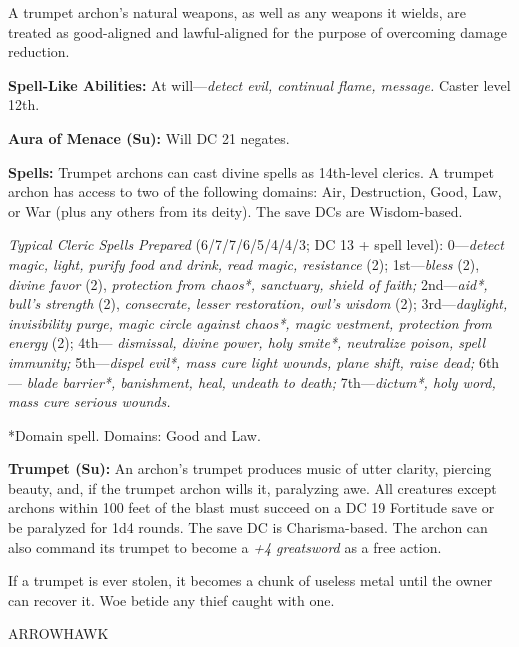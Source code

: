 \documentclass{article}
\begin{document}
A trumpet archon's natural weapons, as well as any weapons it wields, are treated 
as good-aligned and lawful-aligned for the purpose of overcoming damage reduction.

\textbf{Spell-Like Abilities: }At will---\textit{detect evil, continual flame, 
message. }Caster level 12th.

\textbf{Aura of Menace (Su):} Will DC 21 negates.

\textbf{Spells: }Trumpet archons can cast divine spells as 14th-level clerics. 
A trumpet archon has access to two of the following domains: Air, Destruction, 
Good, Law, or War (plus any others from its deity). The save DCs are Wisdom-based.

\textit{Typical Cleric Spells Prepared }(6/7/7/6/5/4/4/3; DC 13 + spell level): 
0---\textit{detect magic, light, purify food and drink, read magic, resistance 
}(2); 1st---\textit{bless }(2), \textit{divine favor }(2), \textit{protection from 
chaos*, sanctuary, shield of faith; }2nd---\textit{aid*, bull's strength }(2), 
\textit{consecrate, lesser restoration, owl's wisdom }(2); 3rd---\textit{daylight, 
invisibility purge, magic circle against chaos*, magic vestment, protection from 
energy }(2); 4th--- \textit{dismissal, divine power, holy smite*, neutralize poison, 
spell immunity; }5th---\textit{dispel evil*, mass cure light wounds, plane shift, 
raise dead; }6th--- \textit{blade barrier*, banishment, heal, undeath to death; 
}7th---\textit{dictum*, holy word, mass cure serious wounds.}

*Domain spell. Domains: Good and Law.

\textbf{Trumpet (Su): }An archon's trumpet produces music of utter clarity, piercing 
beauty, and, if the trumpet archon wills it, paralyzing awe. All creatures except 
archons within 100 feet of the blast must succeed on a DC 19 Fortitude save or 
be paralyzed for 1d4 rounds. The save DC is Charisma-based. The archon can also 
command its trumpet to become a \textit{+4 greatsword }as a free action.

If a trumpet is ever stolen, it becomes a chunk of useless metal until the owner 
can recover it. Woe betide any thief caught with one.

\vspace{12pt}
{\LARGE{}ARROWHAWK}
\end{document}

